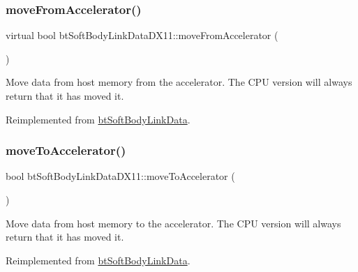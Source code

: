 \subsubsection{\texorpdfstring{move\+From\+Accelerator()}{moveFromAccelerator()}\hspace{0.1cm}{\footnotesize\ttfamily [2/2]}}
{\footnotesize\ttfamily virtual bool bt\+Soft\+Body\+Link\+Data\+D\+X11\+::move\+From\+Accelerator (\begin{DoxyParamCaption}{ }\end{DoxyParamCaption})\hspace{0.3cm}{\ttfamily [virtual]}}

Move data from host memory from the accelerator. The C\+PU version will always return that it has moved it. 

Reimplemented from \hyperlink{classbtSoftBodyLinkData_a5018ad236aae590df94bca63c1ad7ee1}{bt\+Soft\+Body\+Link\+Data}.

\mbox{\label{classbtSoftBodyLinkDataDX11_a6b08733c3c0216869e893779fb55d4c0}} 
\subsubsection{\texorpdfstring{move\+To\+Accelerator()}{moveToAccelerator()}\hspace{0.1cm}{\footnotesize\ttfamily [1/2]}}
{\footnotesize\ttfamily bool bt\+Soft\+Body\+Link\+Data\+D\+X11\+::move\+To\+Accelerator (\begin{DoxyParamCaption}{ }\end{DoxyParamCaption})\hspace{0.3cm}{\ttfamily [virtual]}}

Move data from host memory to the accelerator. The C\+PU version will always return that it has moved it. 

Reimplemented from \hyperlink{classbtSoftBodyLinkData_a6cce268f804d465f3bc998771d3a7433}{bt\+Soft\+Body\+Link\+Data}.

\mbox{\label{classbtSoftBodyLinkDataDX11_a3f94047cb03b1604946c20ae944946a0}} 
